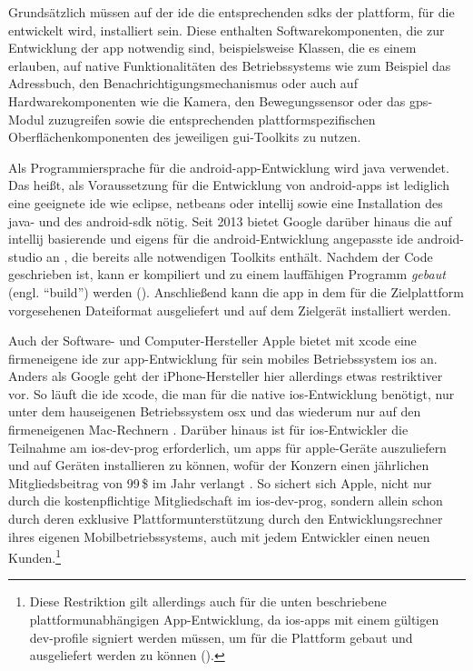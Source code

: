 Grundsätzlich müssen auf der \gls{ide} die entsprechenden \glspl{sdk} der \gls{plattform}, für die entwickelt wird, installiert sein. 
Diese enthalten Softwarekomponenten, die zur Entwicklung der \gls{app} notwendig sind, beispielsweise Klassen, die es einem erlauben, auf native Funktionalitäten des Betriebssystems wie zum Beispiel das Adressbuch, den Benachrichtigungsmechanismus oder auch auf Hardwarekomponenten wie die Kamera, den Bewegungssensor oder das \gls{gps}-Modul zuzugreifen sowie die entsprechenden plattformspezifischen Oberflächenkomponenten des jeweiligen \gls{gui}-Toolkits zu nutzen.

Als Programmiersprache für die \gls{android}-\gls{app}-Entwicklung wird \gls{java} verwendet. Das heißt, als Voraussetzung für die Entwicklung von \gls{android}-\glspl{app} ist lediglich eine geeignete \gls{ide} wie \gls{eclipse}, \gls{netbeans} oder \gls{intellij} sowie eine Installation des \gls{java}- und des \gls{android}-\gls{sdk} nötig. 
Seit 2013 bietet Google darüber hinaus die auf \gls{intellij} basierende und eigens für die \gls{android}-Entwicklung angepasste \gls{ide} \gls{android-studio} an \cite{android-studio}, die bereits alle notwendigen Toolkits enthält. 
Nachdem der Code geschrieben ist, kann er kompiliert und zu einem lauffähigen Programm \emph{gebaut} (engl. \enquote{build}) %
 werden (). Anschließend kann die \gls{app} in dem für die Zielplattform vorgesehenen Dateiformat ausgeliefert und auf dem Zielgerät installiert werden.

Auch der Software- und Computer-Hersteller Apple bietet mit \gls{xcode} eine firmeneigene \gls{ide} zur \gls{app}-Entwicklung für sein mobiles Betriebssystem \gls{ios} an. 
Anders als Google geht der iPhone-Hersteller hier allerdings etwas restriktiver vor. 
So läuft die \gls{ide} \gls{xcode}, die man für die native \gls{ios}-Entwicklung benötigt, nur unter dem hauseigenen Betriebssystem \gls{osx} und das wiederum nur auf den firmeneigenen Mac-Rechnern \cite{Cordova_Documentation_iOS_Platform_Guide}.
Darüber hinaus ist für \gls{ios}-Entwickler die Teilnahme am \gls{ios-dev-prog} erforderlich, um \glspl{app} für \gls{apple}-Geräte auszuliefern und auf Geräten installieren zu können, wofür der Konzern einen jährlichen Mitgliedsbeitrag von 99\,\$ im Jahr verlangt \cite{iOS_Developer_Program}.
So sichert sich Apple, nicht nur durch die kostenpflichtige Mitgliedschaft im \gls{ios-dev-prog}, sondern allein schon durch deren exklusive Plattformunterstützung durch den Entwicklungsrechner ihres eigenen Mobilbetriebssystems, auch mit jedem Entwickler einen neuen Kunden.\footnote{Diese Restriktion gilt allerdings auch für die unten beschriebene plattformunabhängigen App-Entwicklung, da \gls{ios}-\glspl{app} mit einem gültigen \gls{dev-profile} signiert werden müssen, um für die Plattform gebaut und ausgeliefert werden zu können ().}

